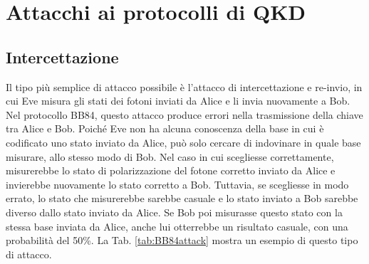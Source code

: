 \newpage
\section{Attacchi ai protocolli di QKD}
\subsection{Intercettazione}
Il tipo più semplice di attacco possibile è l'attacco di intercettazione e re-invio, in cui Eve misura gli stati dei fotoni inviati da Alice e li invia nuovamente a Bob. Nel protocollo BB84, questo attacco produce errori nella trasmissione della chiave tra Alice e Bob. Poiché Eve non ha alcuna conoscenza della base in cui è codificato uno stato inviato da Alice, può solo cercare di indovinare in quale base misurare, allo stesso modo di Bob. Nel caso in cui scegliesse correttamente, misurerebbe lo stato di polarizzazione del fotone corretto inviato da Alice e invierebbe nuovamente lo stato corretto a Bob. Tuttavia, se scegliesse in modo errato, lo stato che misurerebbe sarebbe casuale e lo stato inviato a Bob sarebbe diverso dallo stato inviato da Alice. Se Bob poi misurasse questo stato con la stessa base inviata da Alice, anche lui otterrebbe un risultato casuale, con una probabilità del 50\%. La Tab. \ref{tab:BB84attack} mostra un esempio di questo tipo di attacco.

